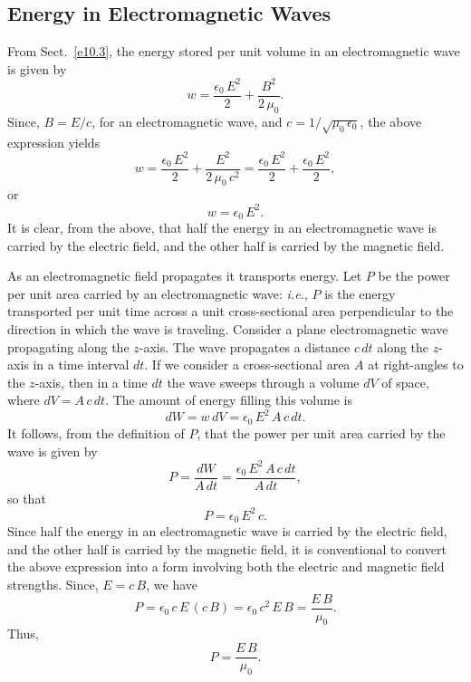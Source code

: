 \subsection{Energy in Electromagnetic Waves}
From Sect.~\ref{e10.3}, the energy stored per unit volume in an electromagnetic
wave is given by
\begin{equation}
w = \frac{\epsilon_0\,E^2}{2} + \frac{B^2}{2\,\mu_0}.
\end{equation}
Since, $B=E/c$, for an electromagnetic wave, and $c= 1/\sqrt{\mu_0\,\epsilon_0}$,
the above expression yields
\begin{equation}
w = \frac{\epsilon_0\,E^2}{2} + \frac{E^2}{2\,\mu_0\,c^2} =
\frac{\epsilon_0\,E^2}{2} + \frac{\epsilon_0\,E^2}{2},
\end{equation}
or
\begin{equation}
w = \epsilon_0\,E^2.
\end{equation}
It is clear, from the above,  that half the energy in an
electromagnetic wave is carried by the electric field, and the other half
is carried by the magnetic field. 

As an electromagnetic field propagates it transports energy. Let $P$ be the
power per unit area carried by an electromagnetic wave:
{\em i.e.}, $P$ is the energy transported per unit time
across a unit cross-sectional area perpendicular to the
direction in which the wave is traveling.  Consider a
plane electromagnetic
wave propagating along the $z$-axis. The wave propagates
 a distance $c\,dt$
along the $z$-axis in a time interval $d t$. If we
consider a cross-sectional area $A$ at right-angles to the $z$-axis, then in
a time $d t$ the wave sweeps  through a volume $d V$ of
space, where $dV = A\,c\,d t$. The
amount of energy filling this volume is
\begin{equation}
d W = w\,d V = \epsilon_0\,E^2\, A\,c\,d t.
\end{equation}
It follows, from the definition of $P$, that the power per unit area carried by
the wave is given by
\begin{equation}
P = \frac{d W}{A\,d t} = \frac{ \epsilon_0\,E^2\, A\,c\,d t}{A\,dt},
\end{equation}
so that
\begin{equation}
P = \epsilon_0\,E^2\, c.
\end{equation}
Since half the energy in an electromagnetic wave is carried by the
electric field, and the other half is carried by the magnetic field, it
is conventional to convert the above expression into a form involving both
the electric and magnetic field strengths. Since, $E=c\,B$, we have
\begin{equation}
P = \epsilon_0\,c\,E\,(c\,B) = \epsilon_0\,c^2\,E\,B = \frac{E\,B}{\mu_0}.
\end{equation}
Thus,
\begin{equation}\label{e11.28}
P = \frac{E\,B}{\mu_0}.
\end{equation}

